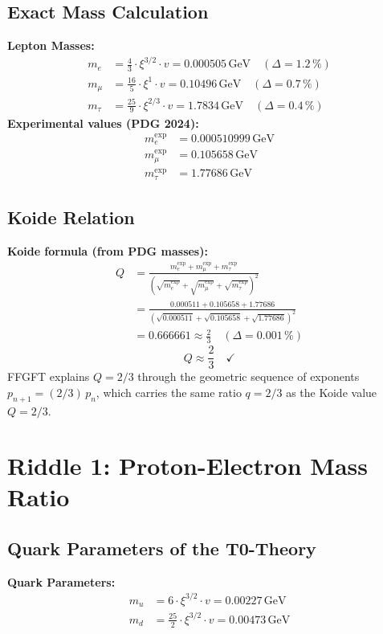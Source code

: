 	\subsection{Exact Mass Calculation}
	\textbf{Lepton Masses:}
	\begin{align}
		m_e &= \frac{4}{3} \cdot \xi^{3/2} \cdot v = 0.000505\,\si{\giga\electronvolt} \quad (\Delta = 1.2\,\%) \\
		m_\mu &= \frac{16}{5} \cdot \xi^{1} \cdot v = 0.10496\,\si{\giga\electronvolt} \quad (\Delta = 0.7\,\%) \\
		m_\tau &= \frac{25}{9} \cdot \xi^{2/3} \cdot v = 1.7834\,\si{\giga\electronvolt} \quad (\Delta = 0.4\,\%)
	\end{align}
	\textbf{Experimental values (PDG 2024):}
	\begin{align}
		m_e^{\text{exp}} &= 0.000510999\,\si{\giga\electronvolt} \\
		m_\mu^{\text{exp}} &= 0.105658\,\si{\giga\electronvolt} \\
		m_\tau^{\text{exp}} &= 1.77686\,\si{\giga\electronvolt}
	\end{align}
	\subsection{Koide Relation}
	\textbf{Koide formula (from PDG masses):}
	\begin{align}
		Q &= \frac{m_e^{\text{exp}} + m_\mu^{\text{exp}} + m_\tau^{\text{exp}}}{(\sqrt{m_e^{\text{exp}}} + \sqrt{m_\mu^{\text{exp}}} + \sqrt{m_\tau^{\text{exp}}})^2} \\
		&= \frac{0.000511 + 0.105658 + 1.77686}{(\sqrt{0.000511} + \sqrt{0.105658} + \sqrt{1.77686})^2} \\
		&= 0.666661 \approx \frac{2}{3} \quad (\Delta = 0.001\,\%)
	\end{align}
	\begin{equation}
		Q \approx \frac{2}{3} \quad \checkmark
	\end{equation}
	FFGFT explains $Q = 2/3$ through the geometric sequence of exponents
	$p_{n+1} = (2/3)\,p_n$, which carries the same ratio $q = 2/3$
	as the Koide value $Q = 2/3$.
	\section{Riddle 1: Proton-Electron Mass Ratio}
	\subsection{Quark Parameters of the T0-Theory}
	\textbf{Quark Parameters:}
	\begin{align}
		m_u &= 6 \cdot \xi^{3/2} \cdot v = 0.00227\,\si{\giga\electronvolt} \\
		m_d &= \frac{25}{2} \cdot \xi^{3/2} \cdot v = 0.00473\,\si{\giga\electronvolt}
	\end{align}
